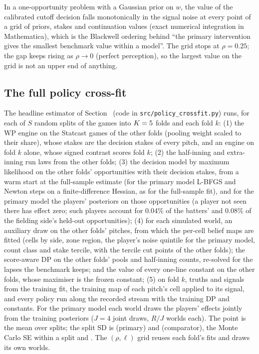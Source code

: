 \documentclass[aoas]{imsart}
\theoremstyle{plain}
\theoremstyle{definition}
\begin{document}
\begin{table}[!htbp]
\caption{The accounting gap with the stakes cross-fitted only, one split, by model and intervention (the earlier
estimator; primary values of Table~ come from the full policy cross-fit).}\label{tab:pidall}
\centering\small

\end{table} In a one-opportunity
problem with a Gaussian prior on $w$, the value of the calibrated cutoff decision falls monotonically in the signal
noise at every point of a grid of priors, stakes and continuation values (exact numerical integration in Mathematica),
which is the Blackwell ordering behind ``the primary intervention gives the smallest benchmark value within a
model''. The grid stops at $\rho=0.25$; the gap keeps rising as $\rho\to0$ (perfect perception), so the largest
value on the grid is not an upper end of anything.

\subsection{The full policy cross-fit}\label{sec:pcfdetail}
The headline estimator of Section~ (code in \nolinkurl{src/policy_crossfit.py}) runs, for each of $S$ random
splits of the games into $K=5$ folds and each fold $k$: (1) the WP engine on the Statcast games of the other folds
(pooling weight scaled to their share), whose stakes are the decision stakes of every pitch, and an engine on fold $k$
alone, whose signed contrast scores fold $k$; (2) the half-inning and extra-inning run laws from the other folds; (3)
the decision model by maximum likelihood on the other folds' opportunities with their decision stakes, from a warm start
at the full-sample estimate (for the primary model L-BFGS and Newton steps on a finite-difference Hessian, as for the
full-sample fit), and for the primary model the players' posteriors on those opportunities (a player not seen there has effect zero; such players account for 0.04\% of the batters' and 0.08\% of the
fielding side's held-out opportunities); (4) for each simulated world, an auxiliary draw on the other folds' pitches, from which the per-cell belief
maps are fitted (cells by side, zone region, the player's noise quintile for the primary model, count class and stake
tercile, with the tercile cut points of the other folds); the score-aware DP on the other folds' pools and half-inning
counts, re-solved for the lapses the benchmark keeps; and the value of every one-line constant on the other folds, whose
maximiser is the frozen constant; (5) on fold $k$, truths and signals from the training fit, the training map of each
pitch's cell applied to its signal, and every policy run along the recorded stream with the training DP and constants.
For the primary model each world draws the players' effects jointly from the training posteriors ($J=4$ joint draws,
$R/J$ worlds each). The point is the mean over splits; the split SD is \GapSplitSD{} (primary) and \GapMainSplitSD{}
(comparator), the Monte Carlo SE within a split \GapMCSE{} and \GapMainMCSE. The $(\rho,\ell)$ grid reuses each fold's fits and draws its own worlds.
\end{document}
